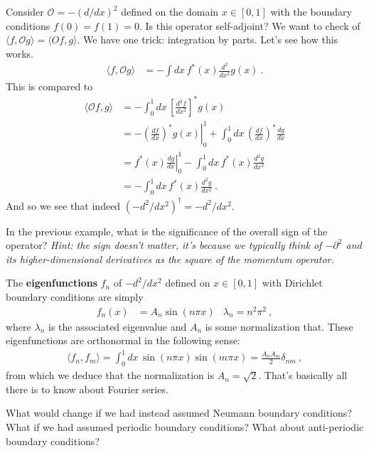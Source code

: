 \documentclass[12pt, oneside]{report}    %
\begin{document}
\begin{example}
Consider $\mathcal O = -(d/dx)^2$ defined on the domain $x\in [0,1]$ with the boundary conditions $f(0)=f(1)=0$. Is this operator self-adjoint? We want to check of $\langle f,\mathcal O g\rangle = \langle O f, g \rangle$. We have one trick: integration by parts. Let's see how this works.
\begin{align}
  \langle f, \mathcal O g\rangle &= - \int dx\, f^*(x)\frac{d^2}{dx^2} g(x) \ .
\end{align}
This is compared to
\begin{align}
  \langle \mathcal O f, g\rangle 
  &= -\int^1_0 dx\, \left[ \frac{d^2f}{dx^2}\right]^*g(x) 
  \\
  &= 
  -\left.
    \left(\frac{df}{dx}\right)^*
    g(x)
    \right|^1_0
  + \int^1_0 dx \, \left(\frac{df}{dx}\right)^* \frac{dg}{dx}
  \\
  &= \left.f^*(x) \frac{dg}{dx} \right|^1_0
  - \int^1_0 dx \, f^*(x) \frac{d^2g}{dx^2}  
  \\
  &=
  - \int^1_0 dx \, f^*(x) \frac{d^2g}{dx^2}
  \ .
\end{align}
And so we see that indeed $(-d^2/dx^2)^\dag = -d^2/dx^2$.
\end{example}
\begin{exercise}
In the previous example, what is the significance of the overall sign of the operator? \emph{Hint: the sign doesn't matter, it's because we typically think of $-\partial^2$ and its higher-dimensional derivatives as the square of the momentum operator.}
\end{exercise}
\begin{example}\label{ex:eigenfunction:fourier}
The \textbf{eigenfunctions} $f_n$ of $-d^2/dx^2$ defined on $x\in [0,1]$ with Dirichlet boundary conditions are simply 
\begin{align}
  f_n(x) &= A_n \sin(n\pi x) 
  &
  \lambda_n = n^2\pi^2 \ ,
  \label{eq:fourier:basis:unit:interval}
\end{align}
where $\lambda_n$ is the associated eigenvalue and $A_n$ is some normalization that. These eigenfunctions are orthonormal in the following sense:
\begin{align}
  \langle f_n, f_m\rangle = \int_0^1 dx\, \sin(n\pi x)\sin(m\pi x) = \frac{A_nA_m}{2} \delta_{nm} \ ,
\end{align}
from which we deduce that the normalization is $A_n = \sqrt{2}$. That's basically all there is to know about Fourier series.
\end{example}
\begin{exercise}
What would change if we had instead assumed Neumann boundary conditions? What if we had assumed periodic boundary conditions? What about anti-periodic boundary conditions?
\end{exercise}
\end{document}
